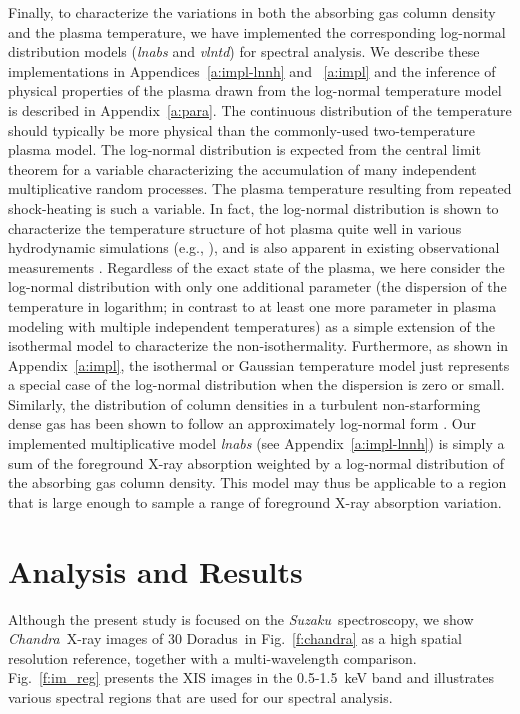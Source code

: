 \documentclass[usenatbib]{mnras}
\def\xs{30 Doradus}
\def\suzaku{{\sl Suzaku}}
\def\chandra{{\sl Chandra}}
\begin{document}
Finally, to characterize the variations in both  the absorbing gas column density and the plasma temperature, we have implemented the corresponding log-normal distribution models ({\sl lnabs} and {\sl vlntd}) for spectral analysis. We describe these implementations in Appendices~\ref{a:impl-lnnh} and ~\ref{a:impl} and the inference of physical properties of the plasma drawn from the log-normal temperature model is described in Appendix~\ref{a:para}. The continuous distribution of the temperature should typically be more physical than the commonly-used two-temperature plasma model. The log-normal distribution is  expected from the central limit theorem for a variable characterizing the accumulation of many independent multiplicative random processes. The plasma temperature resulting from repeated shock-heating is such a variable.
In fact, the log-normal distribution is shown to characterize the temperature structure of hot plasma quite well in various hydrodynamic simulations (e.g., \citealt{Frank}), and is also apparent in existing observational measurements \citep[e.g.,][]{Nakashima2018}. 
Regardless of the exact state of the plasma, we here consider the log-normal distribution with only one additional parameter (the dispersion of the temperature in logarithm; in contrast to at least one more parameter in plasma modeling with multiple independent temperatures) as a simple extension of the isothermal model to characterize the non-isothermality. Furthermore, as shown in Appendix~\ref{a:impl},  the isothermal or Gaussian temperature model just represents a special case of the log-normal distribution when the dispersion is zero or small. Similarly, the distribution of column densities in a turbulent non-starforming dense gas has been shown to follow an approximately log-normal form \citep{Ostriker}. Our implemented multiplicative model {\sl lnabs} (see Appendix~\ref{a:impl-lnnh}) is simply a sum of the foreground X-ray absorption weighted by a log-normal distribution of the absorbing gas column density. This model may thus be applicable to a region that is large enough to sample a range of foreground X-ray absorption variation.

\section{Analysis and Results}
\label{s:res}

Although the present study is focused on the \suzaku\  spectroscopy, we show \chandra\ X-ray images of \xs\ in Fig.~\ref{f:chandra} as a high spatial resolution reference, together with a multi-wavelength comparison.
Fig.~\ref{f:im_reg} presents the XIS images in the 0.5-1.5~keV band and illustrates various spectral regions that are used for our spectral analysis. 
\end{document}
